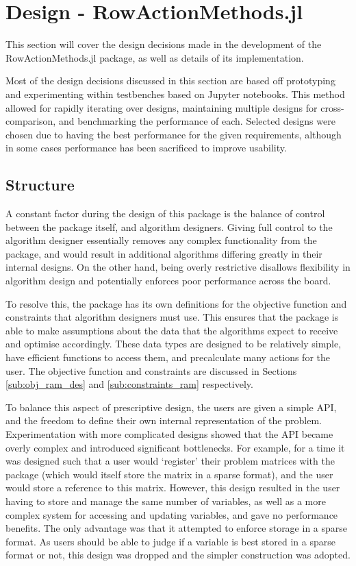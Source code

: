 \section{Design - RowActionMethods.jl}\label{section_design_ram}

This section will cover the design decisions made in the development of the RowActionMethods.jl package, as well as details of its implementation. 

Most of the design decisions discussed in this section are based off prototyping and experimenting within testbenches based on Jupyter notebooks. This method allowed for rapidly iterating over designs, maintaining multiple designs for cross-comparison, and benchmarking the performance of each. Selected designs were chosen due to having the best performance for the given requirements, although in some cases performance has been sacrificed to improve usability.

\subsection{Structure}

A constant factor during the design of this package is the balance of control between the package itself, and algorithm designers. Giving full control to the algorithm designer essentially removes any complex functionality from the package, and would result in additional algorithms differing greatly in their internal designs. On the other hand, being overly restrictive disallows flexibility in algorithm design and potentially enforces poor performance across the board. 

To resolve this, the package has its own definitions for the objective function and constraints that algorithm designers must use. This ensures that the package is able to make assumptions about the data that the algorithms expect to receive and optimise accordingly. These data types are designed to be relatively simple, have efficient functions to access them, and precalculate many actions for the user. The objective function and constraints are discussed in Sections \ref{sub:obj_ram_des} and \ref{sub:constraints_ram} respectively.

To balance this aspect of prescriptive design, the users are given a simple API, and the freedom to define their own internal representation of the problem. Experimentation with more complicated designs showed that the API became overly complex and introduced significant bottlenecks. For example, for a time it was designed such that a user would `register' their problem matrices with the package (which would itself store the matrix in a sparse format), and the user would store a reference to this matrix. However, this design resulted in the user having to store and manage the same number of variables, as well as a more complex system for accessing and updating variables, and gave no performance benefits. The only advantage was that it attempted to enforce storage in a sparse format. As users should be able to judge if a variable is best stored in a sparse format or not, this design was dropped and the simpler construction was adopted.

